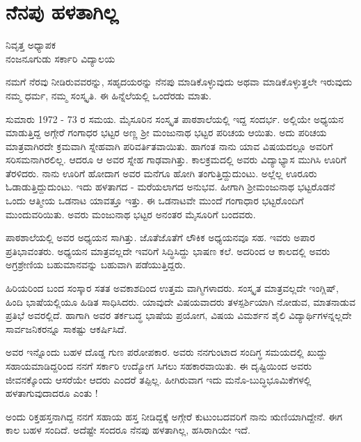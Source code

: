 \chapter{ನೆನಪು ಹಳತಾಗಿಲ್ಲ}

\begin{center}
\smallskip

ನಿವೃತ್ತ ಅಧ್ಯಾಪಕ\\
ನಂಜನೂಗುಡು ಸರ್ಕಾರಿ ವಿದ್ಯಾಲಯ
\end{center}

ನಮಗೆ ನೆರವು ನೀಡಿರುವವರನ್ನು, ಸಹೃದಯರನ್ನು ನೆನಪು ಮಾಡಿಕೊಳ್ಳುವುದು ಅಥವಾ ಮಾಡಿಕೊಳ್ಳುತ್ತಲೇ ಇರುವುದು ನಮ್ಮ ಧರ್ಮ, ನಮ್ಮ ಸಂಸ್ಕೃತಿ. ಈ ಹಿನ್ನೆಲೆಯಲ್ಲಿ ಒಂದೆರಡು ಮಾತು.

ಸುಮಾರು 1972 - 73 ರ ಸಮಯ. ಮೈಸೂರಿನ ಸಂಸ್ಕೃತ ಪಾಠಶಾಲೆಯಲ್ಲಿ ಇದ್ದ ಸಂದರ್ಭ. ಅಲ್ಲಿಯೇ ಅಧ್ಯಯನ ಮಾಡುತ್ತಿದ್ದ ಅಗ್ಗೇರೆ ಗಂಗಾಧರ ಭಟ್ಟರ ಅಣ್ಣ ಶ್ರೀ ಮಂಜುನಾಥ ಭಟ್ಟರ ಪರಿಚಯ ಆಯಿತು. ಅದು ಪರಿಚಯ ಮಾತ್ರವಾಗಿರದೇ ಕ್ರಮವಾಗಿ ಸ್ನೇಹವಾಗಿ ಪರಿವರ್ತಿತವಾಯಿತು. ಹಾಗಂತ ನಾನು ಯಾವ ವಿಷಯದಲ್ಲೂ ಅವರಿಗೆ ಸರಿಸಮನಾಗಿರಲಿಲ್ಲ. ಆದರೂ ಆ ಅವರ ಸ್ನೇಹ ಗಾಢವಾಗಿತ್ತು. ಕಾಲಕ್ರಮದಲ್ಲಿ ಅವರು ವಿದ್ಯಾಭ್ಯಾಸ ಮುಗಿಸಿ ಊರಿಗೆ ತೆರಳಿದರು. ನಾನು ಊರಿಗೆ ಹೋದಾಗ ಅವರ ಮನೆಗೂ ಹೋಗಿ ತಂಗುತ್ತಿದ್ದುದುಂಟು. ಅಲ್ಲೆಲ್ಲ ಊರೂರು ಓಡಾಡುತ್ತಿದ್ದುದುಂಟು. ಇದು ಹಳತಾಗದ - ಮರೆಯಲಾಗದ ಅನುಭವ. ಹೀಗಾಗಿ ಶ್ರೀಮಂಜುನಾಥ ಭಟ್ಟರೊಡನೆ ಒಂದು ಆತ್ಮೀಯ ಒಡನಾಟ ಯಾವತ್ತೂ ಇತ್ತು. ಈ ಒಡನಾಟವೇ ಮುಂದೆ ಗಂಗಾಧಾರ ಭಟ್ಟರೊಂದಿಗೆ ಮುಂದುವರಿಯಿತು. ಅವರು ಮಂಜುನಾಥ ಭಟ್ಟರ ಅನಂತರ ಮೈಸೂರಿಗೆ ಬಂದವರು.

ಪಾಠಶಾಲೆಯಲ್ಲಿ ಅವರ ಅಧ್ಯಯನ ಸಾಗಿತ್ತು. ಜೊತೆಜೊತೆಗೆ ಲೌಕಿಕ ಅಧ್ಯಯನವೂ ಸಹ. ಇವರು ಅಪಾರ ಪ್ರತಿಭಾವಂತರು. ಅಧ್ಯಯನ ಮಾತ್ರವಲ್ಲದೇ ಇವರಿಗೆ ಸಿದ್ಧಿಸಿದ್ದು ಭಾಷಣ ಕಲೆ. ಅದರಿಂದ ಆ ಕಾಲದಲ್ಲಿ ಅವರು ಅಗ್ರಶ್ರೇಣಿಯ ಬಹುಮಾನವನ್ನು ಬಹುವಾಗಿ ಪಡೆಯುತ್ತಿದ್ದರು. 

ಹಿರಿಯರಿಂದ ಬಂದ ಸಂಸ್ಕಾರ ಸತತ ಅವಕಾಶದಿಂದ ಉತ್ತಮ ವಾಗ್ಮಿಗಳಾದರು. ಸಂಸ್ಕೃತ ಮಾತ್ರವಲ್ಲದೇ ಇಂಗ್ಲಿಷ್, ಹಿಂದಿ ಭಾಷೆಯಲ್ಲಿಯೂ ಹಿಡಿತ ಸಾಧಿಸಿದರು. ಯಾವುದೇ ವಿಷಯವಾದರು ತಳಸ್ಪರ್ಶಿಯಾಗಿ ನೋಡುವ, ಮಾತನಾಡುವ ಪ್ರತಿಭೆ ಅವರಲ್ಲಿದೆ. ಹಾಗಾಗಿ ಅವರ ತರ್ಕಬದ್ಧ ಭಾಷೆಯ ಪ್ರಯೋಗ, ವಿಷಯ ವಿಮರ್ಶನ ಶೈಲಿ ವಿದ್ಯಾರ್ಥಿಗಳನ್ನಲ್ಲದೇ ಸಾರ್ವಜನಿಕರನ್ನೂ ಸಾಕಷ್ಟು ಆಕರ್ಷಿಸಿದೆ. 

ಅವರ ಇನ್ನೊಂದು ಬಹಳ ದೊಡ್ಡ ಗುಣ ಪರೋಪಕಾರ. ಅವರು ನನಗುಂಟಾದ ಸಂದಿಗ್ಧ ಸಮಯದಲ್ಲಿ  ಖುದ್ದು ಸಹಾಯಮಾಡಿದ್ದರಿಂದ ನನಗೆ ಸರ್ಕಾರಿ ಉದ್ಯೋಗ ಸಿಗಲು ಸಹಕಾರವಾಯಿತು. ಈ ದೃಷ್ಟಿಯಿಂದ ಅವರು ಜೀವನಕ್ಕೊಂದು ಆಸರೆಯೇ ಆದರು ಎಂದರೆ ತಪ್ಪಿಲ್ಲ. ಹೀಗಿರುವಾಗ ಇದು ಮನೊ-ಬುದ್ಧಿಭೂಮಿಕೆಗಳಲ್ಲಿ ಹಳತಾಗುವುದಾದರೂ ಎಂತು !

ಅಂದು ರಿಕ್ತಹಸ್ತನಾಗಿದ್ದ ನನಗೆ ಸಹಾಯ ಹಸ್ತ ನೀಡಿದ್ದಕ್ಕೆ ಅಗ್ಗೇರೆ ಕುಟುಂಬದವರಿಗೆ ನಾನು ಋಣಿಯಾಗಿದ್ದೇನೆ. ಈಗ ಕಾಲ ಬಹಳ ಸಂದಿದೆ.  ಅದೆಷ್ಟೇ ಸಂದರೂ ನೆನಪು ಹಳತಾಗಿಲ್ಲ, ಹಸಿರಾಗಿಯೇ ಇದೆ.
